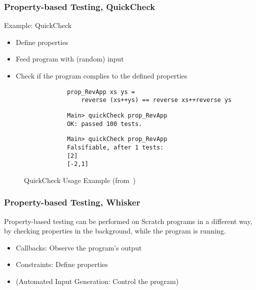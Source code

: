\begin{frame}
\end{frame}

\begin{frame}[fragile]\frametitle{Property-based Testing, QuickCheck}
    Example: QuickCheck

    \medskip

    \begin{itemize}
        \item Define properties
        \item Feed program with (random) input
        \item Check if the program complies to the defined properties
    \end{itemize}

    \pause
    \medskip

    \begin{figure}
        \begin{verbatim}
            prop_RevApp xs ys =
                reverse (xs++ys) == reverse xs++reverse ys
        \end{verbatim}

        \begin{verbatim}
            Main> quickCheck prop_RevApp
            OK: passed 100 tests.
        \end{verbatim}

        \begin{verbatim}
            Main> quickCheck prop_RevApp
            Falsifiable, after 1 tests:
            [2]
            [-2,1]
        \end{verbatim}

        \caption{QuickCheck Usage Example (from~\cite{quickcheck})}
    \end{figure}
\end{frame}

\begin{frame}\frametitle{Property-based Testing, Whisker}
    Property-based testing can be performed on Scratch programs in a different way,
    by checking properties in the background, while the program is running.

    \pause
    \bigskip

    \begin{itemize}
        \item \textcolor{upfim}{Callbacks:} Observe the program's output
        \item \textcolor{upfim}{Constraints}: Define properties
        \item (\textcolor{upfim}{Automated Input Generation}: Control the program)
    \end{itemize}
\end{frame}

